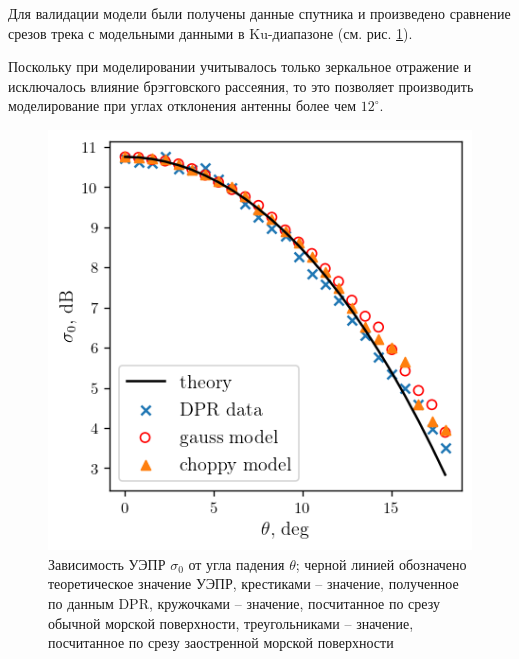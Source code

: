 \documentclass{article}
\begin{document}




Для валидации модели были получены данные спутника  и произведено сравнение
срезов трека с модельными данными в Ku-диапазоне (см. рис. \ref{fig:crosssec}).

Поскольку при моделировании учитывалось только зеркальное отражение и
исключалось влияние брэгговского рассеяния, то это
позволяет производить моделирование при углах отклонения антенны более чем $12^\circ$. 


\begin{figure}[t]
    \centering
    \includegraphics[width=0.6\linewidth]{figs/real_crosssec.png}
    \caption{Зависимость УЭПР $\sigma_0$ от угла падения  $\theta$; 
    черной линией обозначено теоретическое значение УЭПР,
    крестиками -- значение, полученное по данным DPR,
    кружочками -- значение, посчитанное по срезу обычной морской поверхности,
    треугольниками -- значение, посчитанное по срезу заостренной морской поверхности
}
    \label{fig:crosssec}
\end{figure}
\end{document}
